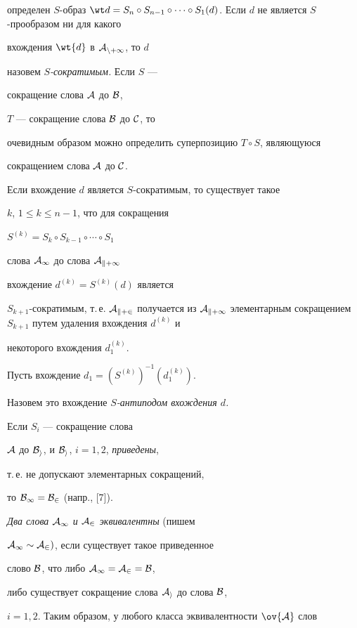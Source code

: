 определен $S$-образ $\wt d=S_n\circ S_{n-1}\circ \dotsb\circ


S_1(d)$. Если $d$ не является $S$-прообразом ни для какого


вхождения $\wt {d}$ в $\cal A_{n+1}$, то $d$


назовем {\it $S$-сократимым.} Если $S$ ---


сокращение слова $\cal A$ до $\cal B$,


$T$ --- сокращение слова $\cal B$ до $\cal C$, то


очевидным образом можно определить суперпозицию $T\circ S$, являющуюся 


сокращением слова $\cal A$ до $\cal C$.





Если вхождение $d$ является $S$-сократимым, то существует такое


$k$, $1\le k\le n-1$, что для сокращения


$S^{(k)}=S_k\circ S_{k-1}\circ \dotsb\circ S_1$


слова $\cal A_1$ до слова $\cal A_{k+1}$


вхождение $d^{(k)}=S^{(k)}(d)$ является


$S_{k+1}$-сократимым, т.\,е. $\cal A_{k+2}$ получается из $\cal A_{k+1}$ элементарным сокращением $S_{k+1}$ путем удаления вхождения $d^{(k)}$ и


некоторого вхождения $d^{(k)}_1$.


Пусть вхождение $d_1=(S^{(k)})^{-1}(d^{(k)}_1)$.


Назовем это вхождение {\it $S$-антиподом вхождения $d$.}





Если $S_i$ --- сокращение слова


$\cal A$ до $\cal B_i$, и $\cal B_i$, $i=1,2$, {\it приведены},


т.\,е. не допускают элементарных сокращений, 


то $\cal B_1=\cal B_2$ (напр., [7]).


{\it Два слова $\cal A_1$ и $\cal A_2$ эквивалентны} (пишем


$\cal A_1\sim\cal A_2)$, если существует такое приведенное


слово $\cal B$, что либо $\cal A_1=\cal A_2=\cal B$,


либо существует сокращение слова $\cal A_i$ до слова $\cal B$,


$i=1,2$. Таким образом, у любого класса эквивалентности $\ov{\cal A}$ слов


